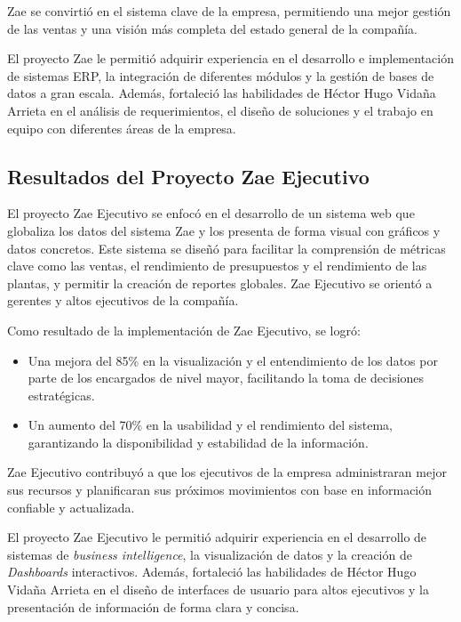 \documentclass[protocolo.tex]{subfiles}
\begin{document}
Zae se convirtió en el sistema clave de la empresa,  permitiendo una mejor gestión de las ventas y una visión más completa del estado general de la compañía.\vspace{4mm}

El proyecto Zae le permitió adquirir experiencia en el desarrollo e implementación de sistemas ERP,  la integración de diferentes módulos y la gestión de bases de datos a gran escala.  Además,  fortaleció las  habilidades de Héctor Hugo Vidaña Arrieta en el análisis de requerimientos,  el diseño de soluciones  y  el  trabajo  en  equipo  con  diferentes  áreas  de  la  empresa.\vspace{4mm}


\subsection{Resultados del Proyecto Zae Ejecutivo}

El proyecto Zae Ejecutivo se enfocó en el desarrollo de un sistema web que globaliza los datos del sistema Zae y los presenta de forma visual con gráficos  y  datos  concretos.  Este sistema se diseñó para  facilitar  la  comprensión  de  métricas  clave  como  las  ventas,  el  rendimiento  de  presupuestos  y  el  rendimiento  de  las  plantas,  y  permitir  la  creación  de  reportes  globales.  Zae  Ejecutivo  se  orientó  a  gerentes  y  altos  ejecutivos  de  la  compañía.\vspace{4mm}

Como resultado de la implementación de Zae Ejecutivo, se logró:

\begin{itemize}
\item Una mejora del 85\%  en la visualización y el entendimiento de los datos por parte de los encargados de nivel mayor,  facilitando la toma de decisiones estratégicas.
\item Un aumento del 70\%  en la usabilidad y el rendimiento del sistema,  garantizando la disponibilidad y estabilidad de la información.
\end{itemize}

Zae Ejecutivo  contribuyó a que los ejecutivos de la empresa administraran mejor sus recursos y  planificaran  sus  próximos  movimientos  con  base  en  información  confiable  y  actualizada.\vspace{4mm}

El proyecto Zae Ejecutivo le permitió adquirir experiencia en el desarrollo de sistemas de  \textit{business intelligence},  la visualización de datos y la creación de  \textit{Dashboards}  interactivos.  Además,  fortaleció las habilidades de Héctor Hugo Vidaña Arrieta en  el  diseño  de  interfaces  de  usuario  para  altos  ejecutivos  y  la  presentación  de  información  de  forma  clara  y  concisa.
\end{document}
